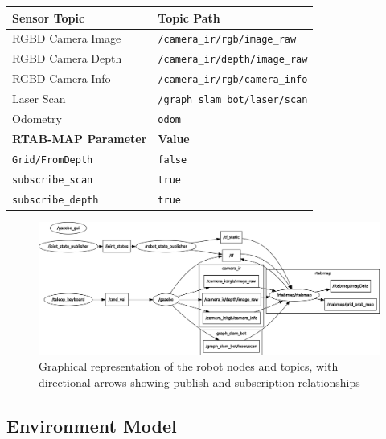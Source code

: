 \documentclass[a4paper]{article}
\begin{document}
\begin{table}[h]
	\centering
		\small
		\begin{tabular}{ll}
			\toprule
			\textbf{Sensor Topic} & \textbf{Topic Path} \\
			\midrule
			RGBD Camera Image & \texttt{/camera\_ir/rgb/image\_raw} \\
			RGBD Camera Depth & \texttt{/camera\_ir/depth/image\_raw} \\
			RGBD Camera Info & \texttt{/camera\_ir/rgb/camera\_info} \\
			Laser Scan & \texttt{/graph\_slam\_bot/laser/scan} \\
			Odometry & \texttt{odom} \\ 
			\midrule
			\textbf{RTAB-MAP Parameter} & \textbf{Value}\\
			\midrule
			\texttt{Grid/FromDepth} & \texttt{false} \\
			\texttt{subscribe\_scan} & \texttt{true} \\
			\texttt{subscribe\_depth} & \texttt{true} \\
			\bottomrule
		\end{tabular}
\end{table}

\clearpage

\begin{figure}
	\centering
	\includegraphics[scale=0.4]{rosgraph}
	\caption{Graphical representation of the robot nodes and topics, with directional arrows showing publish and subscription relationships}
\end{figure}

\clearpage

\subsection{Environment Model}
\end{document}
